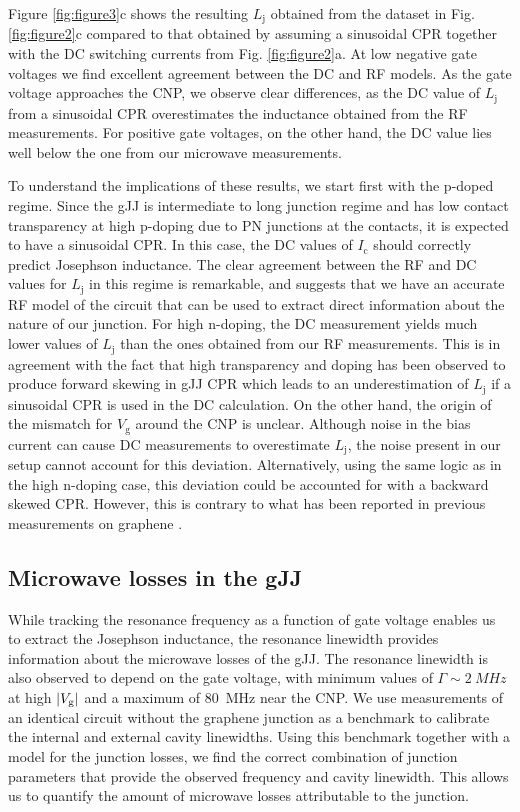 \documentclass[preprint,
  onecolumn,
  notitlepage,
  amsmath,amssymb,
  aip,
  apl,
]{revtex4-1}
\begin{document}
Figure \ref{fig:figure3}c shows the resulting $L_\textrm{j}$ obtained from the dataset in Fig. \ref{fig:figure2}c compared to that obtained by assuming a sinusoidal CPR together with the DC switching currents from Fig. \ref{fig:figure2}a.
At low negative gate voltages we find excellent agreement between the DC and RF models.
As the gate voltage approaches the CNP, we observe clear differences, as the DC value of $L_\textrm{j}$ from a sinusoidal CPR overestimates the inductance obtained from the RF measurements.
For positive gate voltages, on the other hand, the DC value lies well below the one from our microwave measurements.

To understand the implications of these results, we start first with the p-doped regime. 
Since the gJJ is intermediate to long junction regime  and has low contact transparency at high p-doping due to PN junctions at the contacts, it is expected to have a sinusoidal CPR.
In this case, the DC values of $I_\textrm{c}$ should correctly predict Josephson inductance.
The clear agreement between the RF and DC values for $L_\textrm{j}$ in this regime is remarkable, and suggests that we have an accurate RF model of the circuit that can be used to extract direct information about the nature of our junction.
For high n-doping, the DC measurement yields much lower values of $L_\textrm{j}$ than the ones obtained from our RF measurements.
This is in agreement with the fact that high transparency and doping has been observed to produce forward skewing in gJJ CPR \cite{nanda_currentphase_2017} which leads to an underestimation of $L_\textrm{j}$ if a sinusoidal CPR is used in the DC calculation.
On the other hand, the origin of the mismatch for $V_\textrm{g}$ around the CNP is unclear.
Although noise in the bias current can cause DC measurements to overestimate $L_\textrm{j}$, the noise present in our setup cannot account for this deviation.
Alternatively, using the same logic as in the high n-doping case, this deviation could be accounted for with a backward skewed CPR.
However, this is contrary to what has been reported in previous measurements on graphene \cite{english_observation_2016}.

\subsection{Microwave losses in the gJJ}

While tracking the resonance frequency as a function of gate voltage enables us to extract the Josephson inductance, the resonance linewidth provides information about the microwave losses of the gJJ.
The resonance linewidth is also observed to depend on the gate voltage, with minimum values of $\Gamma\sim\SI{2}{MHz}$ at high $|V_{\rm g}|$ and a maximum of \SI{80}{MHz} near the CNP.
We use measurements of an identical circuit without the graphene junction as a benchmark to calibrate the internal and external cavity linewidths.
Using this benchmark together with a model for the junction losses, we find the correct combination of junction parameters that provide the observed frequency and cavity linewidth.
This allows us to quantify the amount of microwave losses attributable to the junction.
\end{document}
